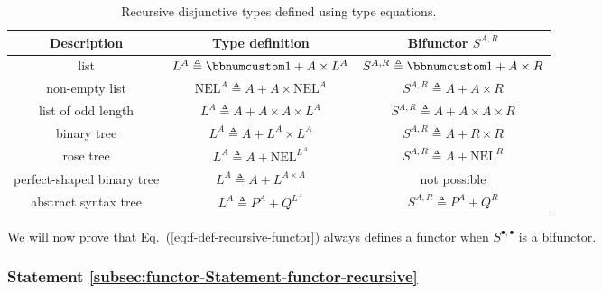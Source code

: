 \begin{table}
\begin{centering}
\begin{tabular}{|c|c|c|}
\hline 
\textbf{\small{}Description} & \textbf{\small{}Type definition} & \textbf{\small{}Bifunctor $S^{A,R}$}\tabularnewline
\hline 
\hline 
{\small{}list} & {\small{}$L^{A}\triangleq\bbnum 1+A\times L^{A}$} & {\small{}$S^{A,R}\triangleq\bbnum 1+A\times R$}\tabularnewline
\hline 
{\small{}non-empty list} & {\small{}$\text{NEL}^{A}\triangleq A+A\times\text{NEL}^{A}$} & {\small{}$S^{A,R}\triangleq A+A\times R$}\tabularnewline
\hline 
{\small{}list of odd length} & {\small{}$L^{A}\triangleq A+A\times A\times L^{A}$} & {\small{}$S^{A,R}\triangleq A+A\times A\times R$}\tabularnewline
\hline 
{\small{}binary tree} & {\small{}$L^{A}\triangleq A+L^{A}\times L^{A}$} & {\small{}$S^{A,R}\triangleq A+R\times R$}\tabularnewline
\hline 
{\small{}rose tree} & {\small{}$L^{A}\triangleq A+\text{NEL}^{L^{A}}$} & {\small{}$S^{A,R}\triangleq A+\text{NEL}^{R}$}\tabularnewline
\hline 
{\small{}perfect-shaped binary tree} & {\small{}$L^{A}\triangleq A+L^{A\times A}$} & {\small{}not possible}\tabularnewline
\hline 
{\small{}abstract syntax tree} & {\small{}$L^{A}\triangleq P^{A}+Q^{L^{A}}$} & {\small{}$S^{A,R}\triangleq P^{A}+Q^{R}$}\tabularnewline
\hline 
\end{tabular}
\par\end{centering}
\caption{Recursive disjunctive types defined using type equations.\label{tab:Examples-of-recursive-disjunctive-type-equations}}
\end{table}

We will now prove that Eq.~(\ref{eq:f-def-recursive-functor}) always
defines a functor when $S^{\bullet,\bullet}$ is a bifunctor.

\subsubsection{Statement \label{subsec:functor-Statement-functor-recursive}\ref{subsec:functor-Statement-functor-recursive}}

